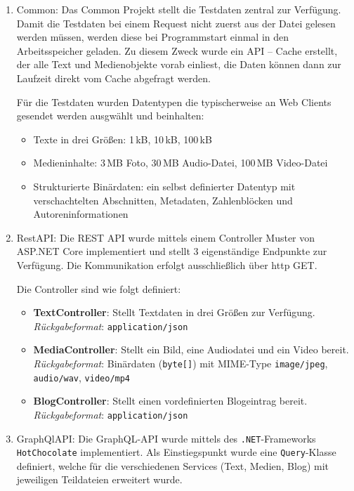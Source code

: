 \begin{enumerate}
	\item Common:
	Das Common Projekt stellt die Testdaten zentral zur Verfügung. Damit die Testdaten bei einem Request nicht zuerst aus der Datei gelesen werden müssen, werden diese bei Programmstart einmal in den Arbeitsspeicher geladen. Zu diesem Zweck wurde ein API – Cache erstellt, der alle Text und Medienobjekte vorab einliest, die Daten können dann zur Laufzeit direkt vom Cache abgefragt werden.
	
	Für die Testdaten wurden Datentypen die typischerweise an Web Clients gesendet werden ausgwählt und beinhalten:
	
	
	\begin{itemize}
		\item Texte in drei Größen: 1\,kB, 10\,kB, 100\,kB
		\item Medieninhalte: 3\,MB Foto, 30\,MB Audio-Datei, 100\,MB Video-Datei
		\item Strukturierte Binärdaten: ein selbst definierter Datentyp mit verschachtelten Abschnitten, Metadaten, Zahlenblöcken und Autoreninformationen
	\end{itemize}
	\item RestAPI:
	Die REST API wurde mittels einem Controller Muster von ASP.NET Core implementiert und stellt 3 eigenständige Endpunkte zur Verfügung. Die Kommunikation erfolgt ausschließlich über http GET.
	
	Die Controller sind wie folgt definiert:
	
	\begin{itemize}
		\item \textbf{TextController}: Stellt Textdaten in drei Größen zur Verfügung.\\
		\emph{Rückgabeformat}: \texttt{application/json}
		\item \textbf{MediaController}: Stellt ein Bild, eine Audiodatei und ein Video bereit.\\
		\emph{Rückgabeformat}: Binärdaten (\texttt{byte[]}) mit MIME-Type \texttt{image/jpeg}, \texttt{audio/wav}, \texttt{video/mp4}
		\item \textbf{BlogController}: Stellt einen vordefinierten Blogeintrag bereit.\\
		\emph{Rückgabeformat}: \texttt{application/json}
	\end{itemize}
	
	\item GraphQlAPI:
	Die GraphQL-API wurde mittels des \texttt{.NET}-Frameworks \texttt{HotChocolate} implementiert.
	Als Einstiegspunkt wurde eine \texttt{Query}-Klasse definiert, welche für die verschiedenen Services (Text, Medien, Blog) mit jeweiligen Teildateien erweitert wurde.
	

\end{enumerate}
